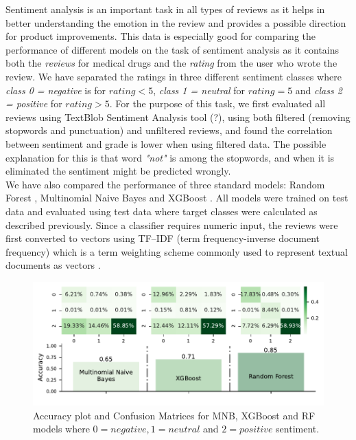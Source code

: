 \documentclass{article}
\begin{document}
Sentiment analysis is an important task in all types of reviews as it helps in better understanding the emotion in the review and provides a possible direction for product improvements. This data is especially good for comparing the performance of different models on the task of sentiment analysis as it contains both the \emph{reviews} for medical drugs and the \emph{rating} from the user who wrote the review. We have separated the ratings in three different sentiment classes where \textit{class 0 = negative} is for $rating<5$, \textit{class 1 = neutral} for $rating=5$ and \textit{class 2 = positive} for $rating>5$. For the purpose of this task, we first evaluated all reviews using TextBlob Sentiment Analysis tool (?), using both filtered (removing stopwords and punctuation) and unfiltered reviews, and found the correlation between sentiment and grade is lower when using filtered data. The possible explanation for this is that word \textit{"not"} is among the stopwords, and when it is eliminated the sentiment might be predicted wrongly.\\
We have also compared the performance of three standard models: Random Forest \citep{randomForest}, Multinomial Naive Bayes \citep{mnb} and XGBoost \citep{xgboost}. All models were trained on test data and evaluated using test data where target classes were calculated as described previously. Since a classifier requires numeric input, the reviews were first converted to vectors using TF–IDF (term frequency-inverse document frequency) which is a term weighting scheme commonly used to represent textual documents as vectors \citep{tfidf}.\\
\begin{figure}[h!]
\includegraphics[width = \textwidth]{plots/figure2.pdf}
\caption{Accuracy plot and Confusion Matrices for MNB, XGBoost and RF models where $0=negative, 1=neutral$ and $2=positive$ sentiment.} 
\label{fig:acc}
\centering
\end{figure}\\
\end{document}
